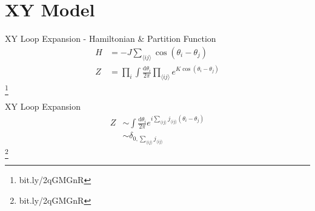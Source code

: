 \documentclass[10pt]{beamer}
\newcommand\blfootnote[1]{%
  \begingroup
  \renewcommand\thefootnote{}\footnote{#1}%
  \addtocounter{footnote}{-1}%
  \endgroup
}
\begin{document}
\section{XY Model}

\begin{frame}{XY Loop Expansion - Hamiltonian \& Partition Function}
    \begin{align*}
        H &= - J \sum_{\langle ij \rangle} \cos(\theta_i - \theta_j) \\
        Z &= \prod_i \int \frac{\mathrm d \theta_i}{2 \pi} \prod_{\langle ij \rangle} e^{K  \cos(\theta_i - \theta_j)}
    \end{align*}
    \blfootnote{bit.ly/2qGMGnR}
\end{frame}

\begin{frame}{XY Loop Expansion}
    \begin{align*}
        Z &\sim \int \frac{\mathrm d \theta_i}{2 \pi} e^{i \sum_{\langle ij \rangle} j_{\langle ij \rangle} (\theta_i - \theta_j)} \\
        & \sim \delta_{0, \sum_{\langle ij \rangle} j_{\langle ij \rangle}}
    \end{align*}
    \blfootnote{bit.ly/2qGMGnR}
\end{frame}



\end{document}
